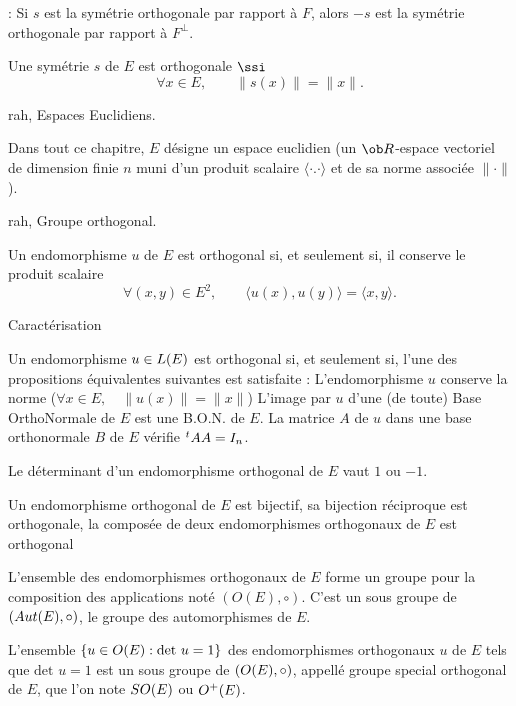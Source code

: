  : Si $s$ est la sym\'etrie orthogonale par rapport \`a $F$, alors $-s$ est la sym\'etrie orthogonale par rapport \`a $F^\perp$. 
\bigskip

%
\bigskip 

 Une sym\'etrie $s$ de $E$ est orthogonale $\ssi$ 
$$
\forall x\in E, \qquad \|s(x)\|=\|x\|. 
$$

%

\Section rah, Espaces Euclidiens. 

Dans tout ce chapitre, $E$ d\'esigne un espace euclidien 
(un $\ob R$-espace vectoriel de dimension finie $n$ 
muni d'un produit scalaire $\langle\cdot.\cdot\rangle$ 
et de sa norme associ\'ee $\|\cdot\|$).
\bigskip

\Subsection rah, Groupe orthogonal. 

Un endomorphisme $u$ de $E$ est orthogonal si, et seulement si, il conserve le produit scalaire
$$
\forall (x,y)\in E^2, \qquad \langle u(x),u(y)\rangle=\langle x,y\rangle.
$$

\Concept Caract\'erisation

Un endomorphisme $u\in\sc L(E)$ est orthogonal si, et seulement si, 
l'une des propositions \'e\-qui\-va\-len\-tes suivantes est satisfaite : \medskip\noindent
L'endomorphisme $u$ conserve la norme ($\forall x\in E, \quad \|u(x)\|=\|x\|$) \medskip\noindent
L'image par $u$ d'une (de toute) Base OrthoNormale de $E$
est une B.O.N. de $E$. \medskip\noindent
La matrice $A$ de $u$ dans une base orthonormale $B$ de $E$ v\'erifie $\null^tAA=I_n$. 

Le d\'eterminant d'un endomorphisme orthogonal de $E$ vaut $1$ ou $-1$. 

Un endomorphisme orthogonal de $E$ est bijectif, 
sa bijection r\'eciproque est orthogonale, 
la compos\'ee de deux endomorphismes orthogonaux de $E$ est orthogonal

L'ensemble des endomorphismes orthogonaux de $E$ forme un groupe pour la composition des applications not\'e $(O(E),\circ)$. 
C'est un sous groupe de $({\sc Aut}(E),\circ)$, le groupe des automorphismes de $E$. 

L'ensemble $\{u\in \sc O(E):\mbox{det\ }u=1\}$ 
des endomorphismes orthogonaux $u$ de $E$ tels que $\mbox{det\ }u=1$ 
est un sous groupe de $(\sc O(E),\circ)$, appell\'e groupe special orthogonal de $E$, 
que l'on note ${\sc SO}(E)$ ou $\sc O^+(E)$. 


